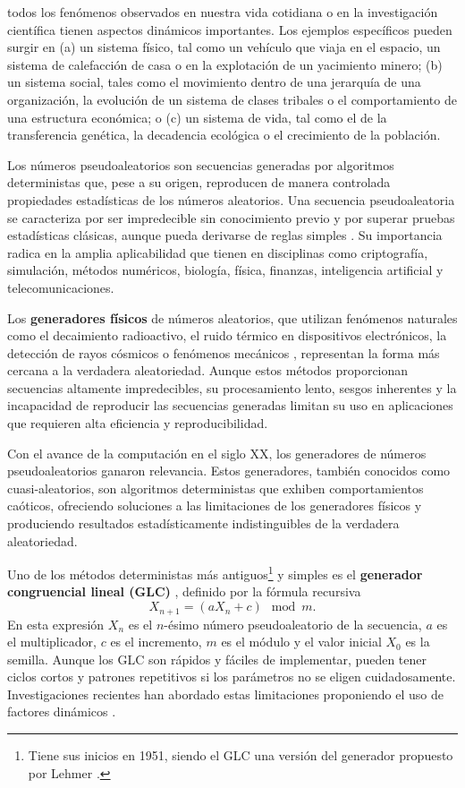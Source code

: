 \documentclass[../Main.tex]{subfiles}
\begin{document}
 todos los fenómenos observados en nuestra vida cotidiana o en la investigación científica tienen aspectos dinámicos importantes. Los ejemplos específicos pueden surgir en (a) un sistema físico, tal como un vehículo que viaja en el espacio, un sistema de calefacción de casa o en la explotación de un yacimiento minero; (b) un sistema social, tales como el movimiento dentro de una jerarquía de una organización, la evolución de un sistema de clases tribales o el comportamiento de una estructura económica; o (c) un sistema de vida, tal como el de la transferencia genética, la decadencia ecológica o el crecimiento de la población.

Los números pseudoaleatorios son secuencias generadas por algoritmos deterministas que, pese a su origen, reproducen de manera controlada propiedades estadísticas de los números aleatorios. Una secuencia pseudoaleatoria se caracteriza por ser impredecible sin conocimiento previo y por superar pruebas estadísticas clásicas, aunque pueda derivarse de reglas simples \cite{Lehmer1951}. Su importancia radica en la amplia aplicabilidad que tienen en disciplinas como criptografía, simulación, métodos numéricos, biología, física, finanzas, inteligencia artificial y telecomunicaciones.

Los \textbf{generadores físicos} de números aleatorios, que utilizan fenómenos naturales como el decaimiento radioactivo, el ruido térmico en dispositivos electrónicos, la detección de rayos cósmicos o fenómenos mecánicos \cite{Madiot2022,Stipcevic2014}, representan la forma más cercana a la verdadera aleatoriedad. Aunque estos métodos proporcionan secuencias altamente impredecibles, su procesamiento lento, sesgos inherentes y la incapacidad de reproducir las secuencias generadas limitan su uso en aplicaciones que requieren alta eficiencia y reproducibilidad.

Con el avance de la computación en el siglo XX, los generadores de números pseudoaleatorios ganaron relevancia. Estos generadores, también conocidos como cuasi-aleatorios, son algoritmos deterministas que exhiben comportamientos caóticos, ofreciendo soluciones a las limitaciones de los generadores físicos y produciendo resultados estadísticamente indistinguibles de la verdadera aleatoriedad.

Uno de los métodos deterministas más antiguos\footnote{Tiene sus inicios en 1951, siendo el GLC una versión del generador propuesto por Lehmer \cite{Lehmer1951}.} y simples es el \textbf{generador congruencial lineal (GLC)} \cite{Lehmer1951,Knuth1997,BaltazarLarios2024}, definido por la fórmula recursiva
\[ X_{n+1} = (aX_n + c) \mod m. \]
En esta expresión $X_n$ es el $n$-ésimo número pseudoaleatorio de la secuencia, \(a\) es el multiplicador, \(c\) es el incremento, \(m\) es el módulo y el valor inicial $X_0$ es la semilla. Aunque los GLC son rápidos y fáciles de implementar, pueden tener ciclos cortos y patrones repetitivos si los parámetros no se eligen cuidadosamente. Investigaciones recientes han abordado estas limitaciones proponiendo el uso de factores dinámicos \cite{Alhomdy2015}.
\end{document}
